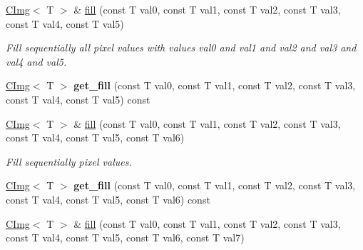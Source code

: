 \begin{DoxyCompactItemize}
\item 
\hypertarget{structcimg__library_1_1CImg_a1aa659d7e3dbb1863a32b4e326c3b752}{
\hyperlink{structcimg__library_1_1CImg}{CImg}$<$ T $>$ \& \hyperlink{structcimg__library_1_1CImg_a1aa659d7e3dbb1863a32b4e326c3b752}{fill} (const T val0, const T val1, const T val2, const T val3, const T val4, const T val5)}
\label{structcimg__library_1_1CImg_a1aa659d7e3dbb1863a32b4e326c3b752}

\begin{DoxyCompactList}\small\item\em Fill sequentially all pixel values with values {\itshape val0\/} and {\itshape val1\/} and {\itshape val2\/} and {\itshape val3\/} and {\itshape val4\/} and {\itshape val5\/}. \item\end{DoxyCompactList}\item 
\hypertarget{structcimg__library_1_1CImg_a4e353f85bf2328a0fa56c9daa7060917}{
\hyperlink{structcimg__library_1_1CImg}{CImg}$<$ T $>$ {\bfseries get\_\-fill} (const T val0, const T val1, const T val2, const T val3, const T val4, const T val5) const }
\label{structcimg__library_1_1CImg_a4e353f85bf2328a0fa56c9daa7060917}

\item 
\hypertarget{structcimg__library_1_1CImg_aa9391155ce2b2933a5d65ffbdd2212cb}{
\hyperlink{structcimg__library_1_1CImg}{CImg}$<$ T $>$ \& \hyperlink{structcimg__library_1_1CImg_aa9391155ce2b2933a5d65ffbdd2212cb}{fill} (const T val0, const T val1, const T val2, const T val3, const T val4, const T val5, const T val6)}
\label{structcimg__library_1_1CImg_aa9391155ce2b2933a5d65ffbdd2212cb}

\begin{DoxyCompactList}\small\item\em Fill sequentially pixel values. \item\end{DoxyCompactList}\item 
\hypertarget{structcimg__library_1_1CImg_ac9e901faed643c64e2bf75d294d2a85a}{
\hyperlink{structcimg__library_1_1CImg}{CImg}$<$ T $>$ {\bfseries get\_\-fill} (const T val0, const T val1, const T val2, const T val3, const T val4, const T val5, const T val6) const }
\label{structcimg__library_1_1CImg_ac9e901faed643c64e2bf75d294d2a85a}

\item 
\hypertarget{structcimg__library_1_1CImg_a991cc09680972324915fac9540f9a75d}{
\hyperlink{structcimg__library_1_1CImg}{CImg}$<$ T $>$ \& \hyperlink{structcimg__library_1_1CImg_a991cc09680972324915fac9540f9a75d}{fill} (const T val0, const T val1, const T val2, const T val3, const T val4, const T val5, const T val6, const T val7)}
\label{structcimg__library_1_1CImg_a991cc09680972324915fac9540f9a75d}


\end{DoxyCompactItemize}
